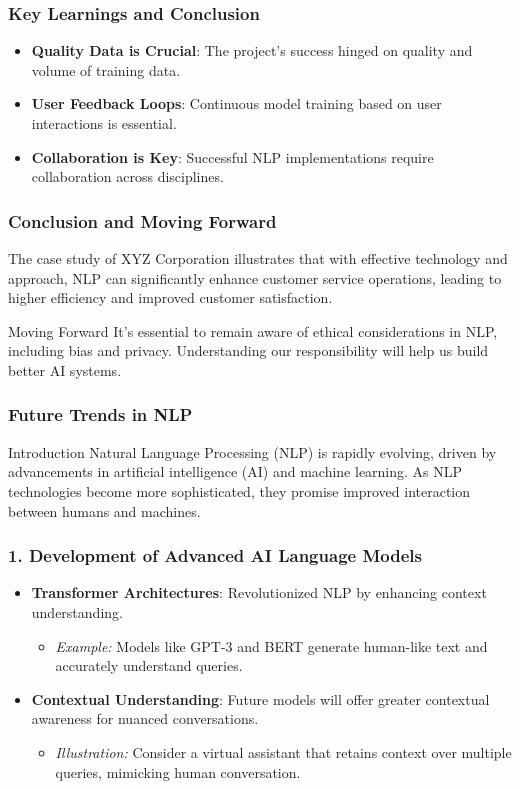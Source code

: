 \documentclass[aspectratio=169]{beamer}
\begin{document}
\begin{frame}
    \frametitle{Key Learnings and Conclusion}
    \begin{itemize}
        \item \textbf{Quality Data is Crucial}: The project's success hinged on quality and volume of training data.
        \item \textbf{User Feedback Loops}: Continuous model training based on user interactions is essential.
        \item \textbf{Collaboration is Key}: Successful NLP implementations require collaboration across disciplines.
    \end{itemize}
\end{frame}

\begin{frame}
    \frametitle{Conclusion and Moving Forward}
    The case study of XYZ Corporation illustrates that with effective technology and approach, NLP can significantly enhance customer service operations, leading to higher efficiency and improved customer satisfaction.

    \begin{block}{Moving Forward}
        It's essential to remain aware of ethical considerations in NLP, including bias and privacy. Understanding our responsibility will help us build better AI systems.
    \end{block}
\end{frame}

\begin{frame}[fragile]
    \frametitle{Future Trends in NLP}
    \begin{block}{Introduction}
        Natural Language Processing (NLP) is rapidly evolving, driven by advancements in artificial intelligence (AI) and machine learning. As NLP technologies become more sophisticated, they promise improved interaction between humans and machines.
    \end{block}
\end{frame}

\begin{frame}[fragile]
    \frametitle{1. Development of Advanced AI Language Models}
    \begin{itemize}
        \item \textbf{Transformer Architectures}: Revolutionized NLP by enhancing context understanding.
        \begin{itemize}
            \item \textit{Example:} Models like GPT-3 and BERT generate human-like text and accurately understand queries.
        \end{itemize}
        \item \textbf{Contextual Understanding}: Future models will offer greater contextual awareness for nuanced conversations.
        \begin{itemize}
            \item \textit{Illustration:} Consider a virtual assistant that retains context over multiple queries, mimicking human conversation.
        \end{itemize}
    \end{itemize}
\end{frame}
\end{document}
